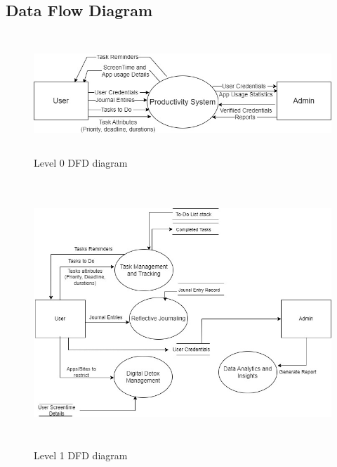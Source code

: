  \newpage
\subsection{Data Flow Diagram}
\begin{figure}[h]
    \centering
    \includegraphics[width=150mm, height= 45mm]{Level0dfd.jpg}
    \caption{Level 0 DFD diagram}
    \label{fig:level 0 DFD}
\end{figure}
\vspace{0.5in}
\begin{figure}[h]
    \centering
    \includegraphics[width=150mm, height = 100mm]{DFDlevel1.jpg}
    \caption{Level 1 DFD diagram}
    \label{fig:level 1 DFD}
\end{figure}

\newpage

